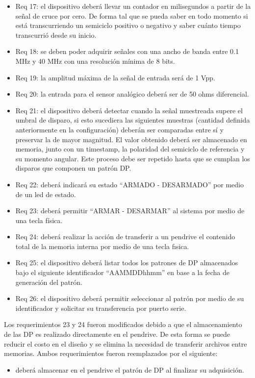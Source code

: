 \begin{itemize}
\item Req 17: el dispositivo deberá llevar un contador en milisegundos a partir de la señal de cruce por cero. De forma tal que se pueda saber en todo momento si está transcurriendo un semiciclo positivo o negativo y saber cuánto tiempo transcurrió desde su inicio.
\item Req 18: se deben poder adquirir señales con una ancho de banda entre 0.1 MHz y 40 MHz con una resolución mínima de 8 bits.
\item Req 19: la amplitud máxima de la señal de entrada será de 1 Vpp.
\item Req 20: la entrada para el sensor analógico deberá ser de 50 ohms diferencial.
\item Req 21: el dispositivo deberá detectar cuando la señal muestreada supere el umbral de disparo, si esto sucediera las siguientes muestras (cantidad definida anteriormente en la configuración) deberán ser comparadas entre sí y preservar la de mayor magnitud. El valor obtenido deberá ser almacenado en memoria, junto con un timestamp, la polaridad del semiciclo de referencia y su momento angular. Este proceso debe ser repetido hasta que se cumplan los disparos que componen un patrón DP.
\item Req 22: deberá indicará su estado “ARMADO - DESARMADO” por medio de un led de estado.
\item Req 23: deberá permitir “ARMAR - DESARMAR” al sistema por medio de una tecla física.
\item Req 24: deberá realizar la acción de transferir a un pendrive el contenido total de la memoria interna por medio de una tecla fısica.
\item Req 25: el dispositivo deberá listar todos los patrones de DP almacenados bajo el siguiente identificador “AAMMDDhhmm” en base a la fecha de generación del patrón.
\item Req 26: el dispositivo deberá permitir seleccionar al patrón por medio de su identificador y solicitar su transferencia por puerto serie.
\end{itemize}

Los requerimientos 23 y 24 fueron modificados debido a que el almacenamiento de las DP es realizado directamente en el pendrive. De esta forma se puede reducir el costo en el diseño y se elimina la necesidad de transferir archivos entre memorias. Ambos requerimientos fueron reemplazados por el siguiente:
\begin{itemize}
\item deberá almacenar en el pendrive el patrón de DP al finalizar su adquisición.
\end{itemize}


